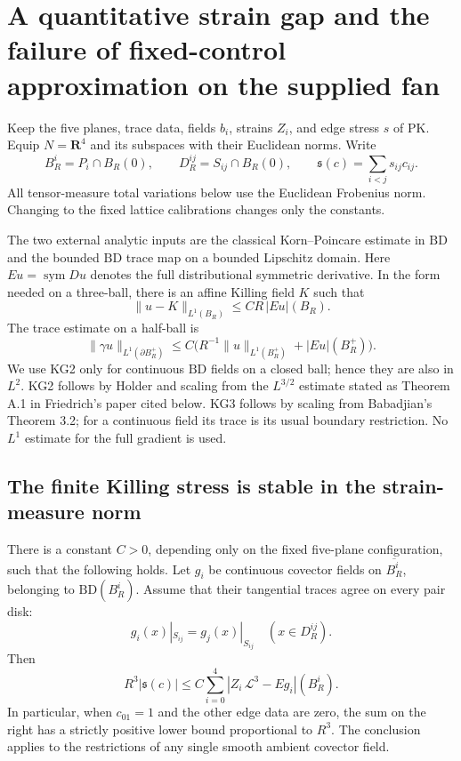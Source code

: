\section{A quantitative strain gap and the failure of fixed-control approximation on the supplied fan}
\label{sec:r13-killing-stress-l1-gap}

Keep the five planes, trace data, fields \(b_i\), strains \(Z_i\),
and edge stress \(s\) of PK.  Equip \(N=\mathbf R^4\) and its
subspaces with their Euclidean norms.  Write
\[
 B_R^i=P_i\cap B_R(0),\qquad
 D_R^{ij}=S_{ij}\cap B_R(0),\qquad
             \mathfrak s(c)=\sum_{i<j}s_{ij}c_{ij}.
 \tag{KG1}
\]
All tensor-measure total variations below use the Euclidean
Frobenius norm.  Changing to the fixed lattice calibrations
changes only the constants.

The two external analytic inputs are the classical
Korn--Poincare estimate in \(\mathrm{BD}\) and the bounded
\(\mathrm{BD}\) trace map on a bounded Lipschitz domain.
Here \(Eu=\operatorname{sym}Du\) denotes the full distributional
symmetric derivative.  In the form needed on a three-ball,
there is an affine Killing field \(K\) such that
\[
 \|u-K\|_{L^1(B_R)}\leq C R\,|Eu|(B_R).
 \tag{KG2}
\]
The trace estimate on a half-ball is
\[
 \|\gamma u\|_{L^1(\partial B_R^+)}
       \leq C\bigl(R^{-1}\|u\|_{L^1(B_R^+)}
                              +|Eu|(B_R^+)\bigr).
 \tag{KG3}
\]
We use KG2 only for continuous \(\mathrm{BD}\) fields on a
closed ball; hence they are also in \(L^2\).  KG2 follows by
Holder and scaling from the \(L^{3/2}\) estimate stated as
Theorem A.1 in Friedrich's paper cited below.  KG3 follows
by scaling from Babadjian's Theorem 3.2; for a continuous
field its trace is its usual boundary restriction.  No
\(L^1\) estimate for the full gradient is used.

\subsection{The finite Killing stress is stable in the strain-measure norm}

\begin{theorem}
\label{thm:r13-strain-measure-gap}
There is a constant \(C>0\), depending only on the fixed
five-plane configuration, such that the following holds.
Let \(g_i\) be continuous covector fields on
\(\overline{B_R^i}\), belonging to \(\mathrm{BD}(B_R^i)\).
Assume that their tangential traces agree on every pair disk:
\[
                  g_i(x)|_{S_{ij}}=g_j(x)|_{S_{ij}}
                           \quad(x\in D_R^{ij}).
 \tag{KG4}
\]
Then
\[
 R^3|\mathfrak s(c)|
       \leq C\sum_{i=0}^4
             |Z_i\,\mathcal L^3-Eg_i|(B_R^i).
 \tag{KG5}
\]
In particular, when \(c_{01}=1\) and the other edge data
are zero, the sum on the right has a strictly positive lower
bound proportional to \(R^3\).  The conclusion applies to
the restrictions of any single smooth ambient covector field.
\end{theorem}

